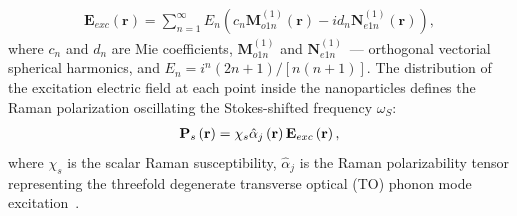         \begin{align}
            \mathbf{E}_{exc}(\mathbf{r})=\sum\nolimits_{n=1}^\infty E_n \left(c_n\mathbf{M}_{o1n}^{(1)}(\mathbf{r}) -
            i{d_n}\mathbf{N}_{e1n}^{(1)}(\mathbf{r})\right) ,
            \label{eq1}
        \end{align}
        where $c_n$ and $d_n$ are Mie coefficients, ${{\mathbf{M}}_{o1n}^{(1)}}$ and ${{\mathbf{N}}_{e1n}^{(1)}}$~---
        orthogonal vectorial spherical harmonics, and ${E_n} = {i^n}(2n + 1)/[n(n + 1)]$. The distribution of the excitation electric field
        at each point inside the nanoparticles defines the Raman polarization oscillating the Stokes-shifted frequency $\omega_S$:
        \begin{align}
            {{\bf{P}}_s}\left( {\bf{r}} \right) = {\chi _s}\hat \alpha_j \left( {\bf{r}} \right){{\bf{E}}_{exc}}\left( {\bf{r}} \right),
            \label{eq2}
        \end{align}
        where $\chi_s$ is the scalar Raman susceptibility, $\hat \alpha_j$ is the Raman polarizability tensor representing
        the threefold degenerate transverse optical (TO) phonon mode excitation~\cite{ralston1970spontaneous, peter2010fundamentals}.

